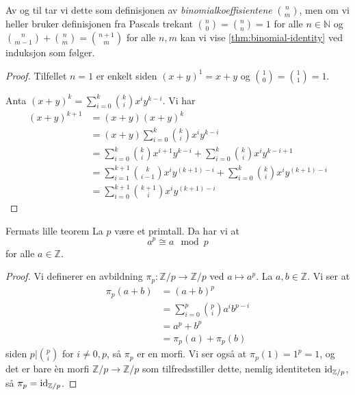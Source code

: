 Av og til tar vi dette som definisjonen av \textit{binomialkoeffisientene}
$\binom n m$,
men om vi heller bruker definisjonen fra Pascals trekant $\binom n 0 = \binom n n = 1$
for alle $n\in\mathbb N$ og $\binom n {m - 1} + \binom n m = \binom {n + 1} m$
for alle $n, m$ kan vi vise \cref{thm:binomial-identity} ved induksjon som følger.
\begin{proof}
    Tilfellet $n = 1$ er enkelt siden
    $(x + y)^1 = x + y$ og $\binom 1 0 = \binom 1 1 = 1$.

    Anta $(x + y)^k = \sum_{i = 0}^k \binom k i x^i y^{k - i}$.
    Vi har
    \[\begin{aligned}
        (x + y)^{k + 1}
        &=  (x + y)(x + y)^k
        \\
        &= (x + y)\sum_{i = 0}^k \binom k i x^i y^{k - i}
        \\
        &= \sum_{i = 0}^k \binom k i x^{i + 1} y^{k - i}
        + \sum_{i = 0}^k \binom k i x^{i} y^{k - i + 1}
        \\
        &= \sum_{i = 1}^{k + 1} \binom k {i - 1} x^{i} y^{(k + 1) - i}
        + \sum_{i = 0}^k \binom k i x^{i} y^{(k + 1) - i}
        \\
        &= \sum_{i = 0}^{k + 1} \binom {k + 1} i x^{i} y^{(k + 1) - i}
    \end{aligned}\]
\end{proof}

\begin{corollary}{Fermats lille teorem}
    La $p$ være et primtall.
    Da har vi at
    \[
        a^p \cong a \mod p
    \]
    for alle $a\in \mathbb Z$.
\end{corollary}
\begin{proof}
    Vi definerer en avbildning $\pi_p\colon \mathbb Z / p\to\mathbb Z / p$
    ved $a\mapsto a^p$.
    La $a,b\in \mathbb Z$.
    Vi ser at
    \[\begin{aligned}
        \pi_p(a + b)
        &= (a + b)^p
        \\
        &= \sum_{i = 0}^p \binom p i a^i b^{p - i}
        \\
        &= a^p + b^p
        \\
        &= \pi_p(a) + \pi_p(b)
    \end{aligned}\]
    siden $p|\binom p i$ for $i\neq 0, p$,
    så $\pi_p$ er en morfi.
    Vi ser også at $\pi_p(1) = 1^p = 1$,
    og det er bare \`en morfi $\mathbb Z / p\to \mathbb Z / p$
    som tilfredsstiller dette, nemlig identiteten $\operatorname{id}_{\mathbb Z / p}$,
    så $\pi_p = \operatorname{id}_{\mathbb Z / p}$.
\end{proof}
